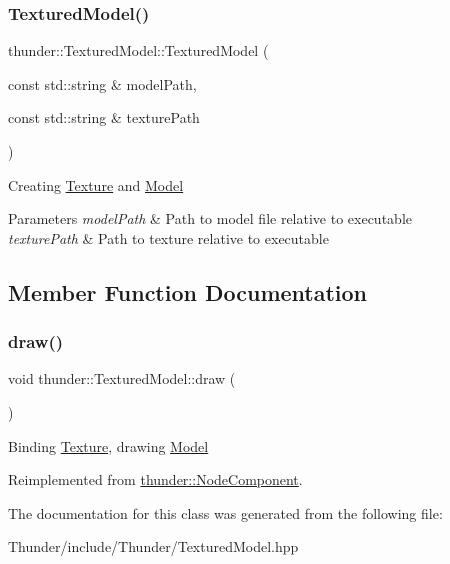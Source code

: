 \subsubsection{\texorpdfstring{Textured\+Model()}{TexturedModel()}}
{\footnotesize\ttfamily thunder\+::\+Textured\+Model\+::\+Textured\+Model (\begin{DoxyParamCaption}\item[{const std\+::string \&}]{model\+Path,  }\item[{const std\+::string \&}]{texture\+Path }\end{DoxyParamCaption})}

Creating \mbox{\hyperlink{classthunder_1_1_texture}{Texture}} and \mbox{\hyperlink{classthunder_1_1_model}{Model}}


\begin{DoxyParams}{Parameters}
{\em model\+Path} & Path to model file relative to executable \\
\hline
{\em texture\+Path} & Path to texture relative to executable \\
\hline
\end{DoxyParams}


\subsection{Member Function Documentation}
\mbox{\label{classthunder_1_1_textured_model_a20535970e84f2debb4cb2a5eabdfa93c}} 
\subsubsection{\texorpdfstring{draw()}{draw()}}
{\footnotesize\ttfamily void thunder\+::\+Textured\+Model\+::draw (\begin{DoxyParamCaption}{ }\end{DoxyParamCaption})\hspace{0.3cm}{\ttfamily [virtual]}}

Binding \mbox{\hyperlink{classthunder_1_1_texture}{Texture}}, drawing \mbox{\hyperlink{classthunder_1_1_model}{Model}} 

Reimplemented from \mbox{\hyperlink{classthunder_1_1_node_component_a1edbd50e6595a2ad181d14683c98f405}{thunder\+::\+Node\+Component}}.



The documentation for this class was generated from the following file\+:\begin{DoxyCompactItemize}
\item 
Thunder/include/\+Thunder/Textured\+Model.\+hpp\end{DoxyCompactItemize}
